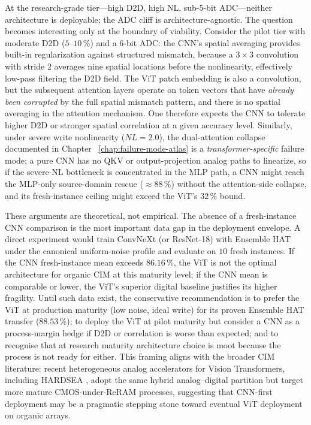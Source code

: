 At the research-grade tier---high D2D, high NL, sub-5-bit ADC---neither architecture is deployable; the ADC cliff is architecture-agnostic.  The question becomes interesting only at the boundary of viability.  Consider the pilot tier with moderate D2D ($5$--$10\,\%$) and a 6-bit ADC: the CNN's spatial averaging provides built-in regularization against structured mismatch, because a $3 \times 3$ convolution with stride 2 averages nine spatial locations before the nonlinearity, effectively low-pass filtering the D2D field.  The ViT patch embedding is also a convolution, but the subsequent attention layers operate on token vectors that have \emph{already been corrupted} by the full spatial mismatch pattern, and there is no spatial averaging in the attention mechanism.  One therefore expects the CNN to tolerate higher D2D or stronger spatial correlation at a given accuracy level.  Similarly, under severe write nonlinearity ($NL=2.0$), the dual-attention collapse documented in Chapter~
\ref{chap:failure-mode-atlas} is a \emph{transformer-specific} failure mode; a pure CNN has no QKV or output-projection analog paths to linearize, so if the severe-NL bottleneck is concentrated in the MLP path, a CNN might reach the MLP-only source-domain rescue ($\approx 88\,\%$) without the attention-side collapse, and its fresh-instance ceiling might exceed the ViT's $32\,\%$ bound.

These arguments are theoretical, not empirical.  The absence of a fresh-instance CNN comparison is the most important data gap in the deployment envelope.  A direct experiment would train ConvNeXt (or ResNet-18) with Ensemble HAT under the canonical uniform-noise profile and evaluate on $10$ fresh instances.  If the CNN fresh-instance mean exceeds $86.16\,\%$, the ViT is not the optimal architecture for organic CIM at this maturity level; if the CNN mean is comparable or lower, the ViT's superior digital baseline justifies its higher fragility.  Until such data exist, the conservative recommendation is to prefer the ViT at production maturity (low noise, ideal write) for its proven Ensemble HAT transfer ($88.53\,\%$); to deploy the ViT at pilot maturity but consider a CNN as a process-margin hedge if D2D or correlation is worse than expected; and to recognise that at research maturity architecture choice is moot because the process is not ready for either.  This framing aligns with the broader CIM literature: recent heterogeneous analog accelerators for Vision Transformers, including HARDSEA \citep{lin2024hardsea}, adopt the same hybrid analog--digital partition but target more mature CMOS-under-ReRAM processes, suggesting that CNN-first deployment may be a pragmatic stepping stone toward eventual ViT deployment on organic arrays.


